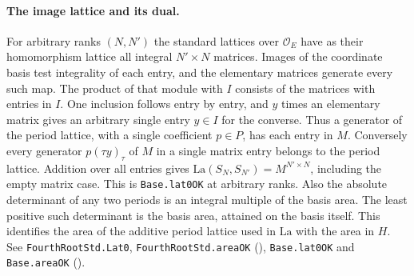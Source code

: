 \paragraph{The image lattice and its dual.}\label{r16:std-dual}
For arbitrary ranks $(N,N')$ the standard lattices over
$\mathcal O_E$ have as their homomorphism lattice all integral
$N'\times N$ matrices. Images of the coordinate basis test integrality of each
entry, and the elementary matrices generate every such map. The
product of that module with $I$ consists of the matrices with entries
in $I$. One inclusion follows entry by entry, and $y$ times an
elementary matrix gives an arbitrary single entry $y\in I$ for the
converse. Thus a generator of the period lattice, with a single
coefficient $p\in P$, has each entry in $M$. Conversely every generator
$p(\tau y)_\tau$ of $M$ in a single matrix entry belongs to the period
lattice. Addition over all entries gives
$\mathrm{La}(S_N,S_{N'})=M^{N'\times N}$, including the empty matrix
case. This is \nolinkurl{Base.lat0OK} at arbitrary ranks. Also the
absolute determinant of any two periods is an integral multiple of the
basis area. The least positive such determinant is the basis area,
attained on the basis itself. This identifies the area of the additive
period lattice used in $\mathrm{La}$ with the area in $H$.
See \nolinkurl{FourthRootStd.Lat0}, \nolinkurl{FourthRootStd.areaOK}
(),
\nolinkurl{Base.lat0OK} and \nolinkurl{Base.areaOK}
().


